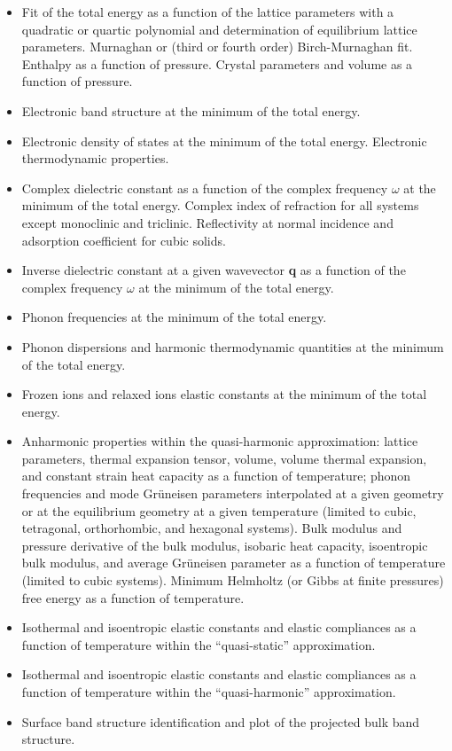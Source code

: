 \documentclass[12pt,a4paper,twoside]{report}
\begin{document}
\begin{itemize}
\item Fit of the total energy as a function of the lattice parameters with
a quadratic or quartic polynomial and determination of equilibrium lattice 
parameters. Murnaghan or (third or fourth order) Birch-Murnaghan fit. 
Enthalpy as a function of pressure. Crystal
parameters and volume as a function of pressure. 

\item Electronic band structure at the minimum of the total energy.

\item Electronic density of states at the minimum of the total energy.
Electronic thermodynamic properties.  

\item Complex dielectric constant as a function of the complex
frequency $\omega$ at the minimum of the total energy. Complex index 
of refraction for all systems except monoclinic and triclinic. Reflectivity 
at normal incidence and adsorption coefficient for cubic solids.

\item Inverse dielectric constant at a given wavevector {\bf q} as a function 
of the complex frequency $\omega$ at the minimum of the total energy.

\item Phonon frequencies at the minimum of the total energy.

\item Phonon dispersions and harmonic thermodynamic quantities
at the minimum of the total energy.

\item Frozen ions and relaxed ions elastic constants at the minimum of the total
energy.

\item Anharmonic properties within the quasi-harmonic approximation: 
lattice parameters, thermal expansion tensor, volume, volume thermal 
expansion, and constant strain heat capacity as a function of temperature; 
phonon frequencies and mode Gr\"uneisen parameters interpolated at a given
geometry or at the equilibrium geometry at a given temperature
(limited to cubic, tetragonal, orthorhombic, and hexagonal systems).
Bulk modulus and pressure derivative of the bulk modulus, isobaric heat 
capacity, isoentropic bulk modulus, and average Gr\"uneisen parameter as 
a function of temperature (limited to cubic systems).
Minimum Helmholtz (or Gibbs at finite pressures) free energy 
as a function of temperature.

\item Isothermal and isoentropic elastic constants and 
elastic compliances as a function of temperature within the ``quasi-static'' 
approximation.

\item Isothermal and isoentropic elastic constants and 
elastic compliances as a function of temperature within the 
``quasi-harmonic'' approximation.

\item Surface band structure identification and plot of the projected bulk
band structure.

\end{itemize}
\end{document}
